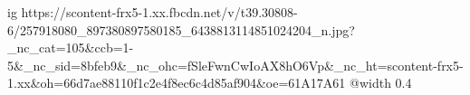  
 
 
 
 

\ifcmt
  ig https://scontent-frx5-1.xx.fbcdn.net/v/t39.30808-6/257918080_897380897580185_6438813114851024204_n.jpg?_nc_cat=105&ccb=1-5&_nc_sid=8bfeb9&_nc_ohc=fSleFwnCwIoAX8hO6Vp&_nc_ht=scontent-frx5-1.xx&oh=66d7ae88110f1c2e4f8ec6c4d85af904&oe=61A17A61
  @width 0.4
\fi
